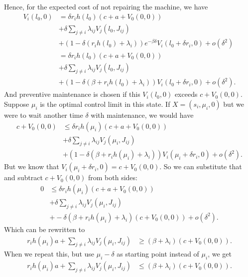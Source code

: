 Hence, for the expected cost of not repairing the machine, we have
\begin{equation}
\begin{split}
V_i(l_0,0)&=\delta r_i h(l_0)(c+a+V_0(0,0))\\
&+\delta\sum\limits_{j\neq i}\lambda_{ij}V_j(l_0,J_{ij})\\
&+(1-\delta(r_ih(l_0)+\lambda_i))e^{-\beta\delta}V_i(l_0+\delta r_i,0)+o(\delta^2)\\
&=\delta r_i h(l_0) (c+a+V_0(0,0))\\
&+\delta\sum\limits_{j\neq i}\lambda_{ij}V_j(l_0,J_{ij})\\
&+(1-\delta(\beta+r_ih(l_0)+\lambda_i))V_i(l_0+\delta r_i,0)+o(\delta^2).
\end{split}
\end{equation}
And preventive maintenance is chosen if this $V_i(l_0,0)$ exceeds $c+V_0(0,0)$.
Suppose $\mu_i$ is the optimal control limit in this state.
If $X=(s_i,\mu_i,0)$ but we were to wait another time $\delta$ with maintenance, we would have
\begin{equation}
\begin{split}
c+V_0(0,0)&\leq\delta r_i h(\mu_i) (c+a+V_0(0,0))\\
&+\delta\sum\limits_{j\neq i}\lambda_{ij}V_j(\mu_i,J_{ij})\\
&+(1-\delta(\beta+r_ih(\mu_i)+\lambda_i))V_i(\mu_i+\delta r_i,0)+o(\delta^2).
\end{split}
\end{equation}
But we know that $V_i(\mu_i+\delta r_i,0)=c+V_0(0,0)$.
So we can substitute that and subtract $c+V_0(0,0)$ from both sides:
\begin{equation}
\begin{split}
0&\leq\delta r_i h(\mu_i) (c+a+V_0(0,0))\\
&+\delta\sum\limits_{j\neq i}\lambda_{ij}V_j(\mu_i,J_{ij})\\
&+-\delta(\beta+r_ih(\mu_i)+\lambda_i)(c+V_0(0,0))+o(\delta^2).
\end{split}
\end{equation}
Which can be rewritten to
\begin{equation}
\begin{split}
r_i h(\mu_i)a+\sum\limits_{j\neq i}\lambda_{ij}V_j(\mu_i,J_{ij})&\geq(\beta+\lambda_i)(c+V_0(0,0)).
\end{split}
\end{equation}
When we repeat this, but use $\mu_i-\delta$ as starting point instead of $\mu_i$, we get
\begin{equation}
\begin{split}
r_i h(\mu_i)a+\sum\limits_{j\neq i}\lambda_{ij}V_j(\mu_i,J_{ij})&\leq(\beta+\lambda_i)(c+V_0(0,0)).
\end{split}
\end{equation}
